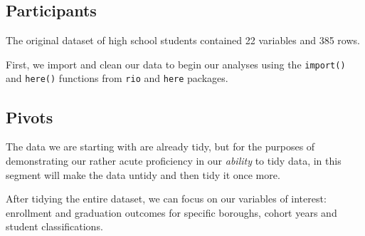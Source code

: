 \documentclass[
  english,
  man, fleqn, noextraspace]{apa6}
\newenvironment{Shaded}{\begin{snugshade}}{\end{snugshade}}
\newcommand{\DataTypeTok}[1]{\textcolor[rgb]{0.13,0.29,0.53}{#1}}
\newcommand{\DecValTok}[1]{\textcolor[rgb]{0.00,0.00,0.81}{#1}}
\newcommand{\KeywordTok}[1]{\textcolor[rgb]{0.13,0.29,0.53}{\textbf{#1}}}
\newcommand{\NormalTok}[1]{#1}
\newcommand{\OperatorTok}[1]{\textcolor[rgb]{0.81,0.36,0.00}{\textbf{#1}}}
\newcommand{\OtherTok}[1]{\textcolor[rgb]{0.56,0.35,0.01}{#1}}
\newcommand{\StringTok}[1]{\textcolor[rgb]{0.31,0.60,0.02}{#1}}
\begin{document}
\hypertarget{participants}{%
\subsection{Participants}\label{participants}}

The original dataset of high school students contained 22 variables and 385 rows.

First, we import and clean our data to begin our analyses using the \texttt{import()} and \texttt{here()} functions from \texttt{rio} and \texttt{here} packages.

\hypertarget{pivots}{%
\subsection{Pivots}\label{pivots}}

The data we are starting with are already tidy, but for the purposes of demonstrating our rather acute proficiency in our \emph{ability} to tidy data, in this segment will make the data untidy and then tidy it once more.

\begin{Shaded}
\end{Shaded}

After tidying the entire dataset, we can focus on our variables of interest: enrollment and graduation outcomes for specific boroughs, cohort years and student classifications.
\end{document}
